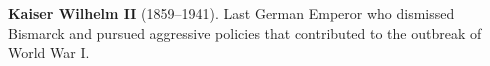 \textbf{Kaiser Wilhelm II} (1859–1941). Last German Emperor who dismissed Bismarck and pursued aggressive policies that contributed to the outbreak of World War I.

